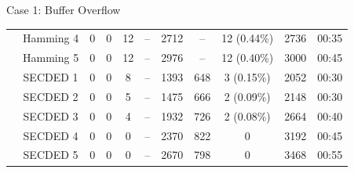 \begin{frame}[noframenumbering]{Case 1: Buffer Overflow}
\begin{table}[H]
\begin{tabular}{@{}ccccccccccc@{}}
                                                               & Hamming 4 & 0     & 0      & 12    & --        & 2712                                     & --                                      & 12 {\tiny (0.44\%)}                           & 2736        & 00:35                           \\
                                                               & Hamming 5 & 0     & 0      & 12    & --        & 2976                                     & --                                      & 12 {\tiny (0.40\%)}                           & 3000        & 00:45                           \\
                                                               & SECDED 1       & 0     & 0      & 8     & --        & 1393                                     & 648                                     & 3 {\tiny (0.15\%)}                            & 2052        & 00:30                           \\
                                                               & SECDED 2       & 0     & 0      & 5     & --        & 1475                                     & 666                                     & 2 {\tiny (0.09\%)}                            & 2148        & 00:30                           \\
                                                               & SECDED 3       & 0     & 0      & 4     & --        & 1932                                     & 726                                     & 2 {\tiny (0.08\%)}                            & 2664        & 00:40                           \\
                                                               & SECDED 4       & 0     & 0      & 0     & --        & 2370                                     & 822                                     & 0                                             & 3192        & 00:45                           \\
                                                               & SECDED 5       & 0     & 0      & 0     & --        & 2670                                     & 798                                     & 0                                             & 3468        & 00:55                           \\
            \bottomrule
        \end{tabular}
    \end{table}
\end{frame}
